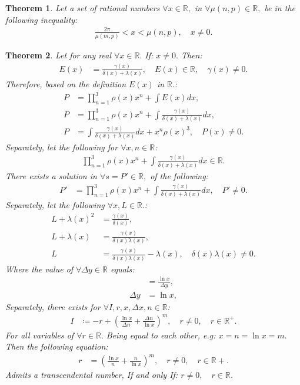 \documentclass[10pt]{article}
\theoremstyle{plain}
\newtheorem{theorem}{Theorem}[section]
\theoremstyle{definition}
\theoremstyle{remark}
\begin{document}
\begin{theorem}
	Let a set of rational numbers $\forall x \in \mathbb{R},$ in $\forall \mu(n, p) \in \mathbb{R},$ be in the following inequality:
	\begin{align*}
		\frac{2\pi}{\mu(m, p)} < x < \mu(n, p), \quad x \neq 0.
	\end{align*}
\end{theorem}

\begin{theorem}
	Let for any real $\forall x \in \mathbb{R}.$ If: $x \neq 0.$ Then:
	\begin{align*}
		E(x) &= \frac{\gamma(x)}{\delta(x) + \lambda(x)}, \quad E(x) \in \mathbb{R}, \quad \gamma(x) \neq 0.
	\end{align*}
	Therefore, based on the definition $E(x)$ in $\mathbb{R}.$:
	\begin{align*}
		P &= \prod_{n=1}^{3}\rho(x) x^{n} + \int E(x) dx,\\
		P &= \prod_{n=1}^{3}\rho(x) x^{n} + \int \frac{\gamma(x)}{\delta(x) + \lambda(x)} dx,\\
		P &= \int \frac{\gamma(x)}{\delta(x) + \lambda(x)} dx + x^{n} \rho(x)^{3}, \quad P(x) \neq 0.
	\end{align*}
	Separately, let the following for $\forall x, n \in \mathbb{R}$:
	\begin{align*}
		\prod_{n=1}^{3}\rho(x) x^{n} + \int \frac{\gamma(x)}{\delta(x) + \lambda(x)} dx \in \mathbb{R}.
	\end{align*}
	There exists a solution in $\forall s = P' \in \mathbb{R},$ of the following:
	\begin{align*}
		P' &= \prod_{n=1}^{3}\rho(x) x^{n} + \int \frac{\gamma(x)}{\delta(x) + \lambda(x)} dx, \quad P' \neq 0.
	\end{align*}
	Separately, let the following $\forall x, L \in \mathbb{R}.$:
	\begin{align*}
		L + \lambda(x)^{2} &= \frac{\gamma(x)}{\delta(x)},\\
	 	L + \lambda(x) &= \frac{\gamma(x)}{\delta(x)  \lambda(x) },\\
	 	L &= \frac{\gamma(x)}{\delta(x)  \lambda(x) } - \lambda(x), \quad \delta(x)\lambda(x) \neq 0.
	\end{align*}
	Where the value of $\forall \Delta y \in \mathbb{R}$ equals:
	\begin{align*}
		&= \frac{\ln x}{\Delta y},\\
		\Delta y &= \ln x,
	\end{align*}
	Separately, there exists for $\forall I, r, x, \Delta x, n \in \mathbb{R}$:
	\begin{align*}
		I &\coloneq -r + ( \frac{\ln x}{\Delta n} + \frac{\Delta n}{\ln x})^m, \quad r \neq 0, \quad r \in \mathbb{R}^{+}.
	\end{align*}
	For all variables of $\forall r \in \mathbb{R}.$ Being equal to each other, e.g: $x = n = \ln x = m.$ Then the following equation:
	\begin{align*}
		r &= ( \frac{\ln x}{n} + \frac{n}{\ln x})^m, \quad r \neq 0, \quad r \in \mathbb{R}{+}.
	\end{align*}
	Admits a transcendental number, If and only If: $r \neq 0, \quad r \in \mathbb{R}$.
\end{theorem}
\end{document}
